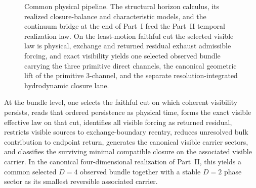 \begin{figure}[ht]
{%
}
\caption{Common physical pipeline. The structural horizon calculus, its
realized closure-balance and characteristic models, and the continuum bridge
at the end of Part~I feed the Part~II temporal realization law.
On the least-motion faithful cut the selected visible law is physical,
exchange and returned residual exhaust admissible forcing, and exact
visibility yields one selected observed bundle carrying the three primitive
direct channels, the canonical geometric lift of the primitive
\(3\)-channel, and the separate resolution-integrated hydrodynamic closure
lane.}
\label{fig:part-iv-common-pipeline}
\end{figure}

\begin{remark}
\label{rem:bundle-first-reading}
At the bundle level, one selects the faithful cut on which coherent visibility
persists, reads that ordered persistence as physical time, forms the exact
visible effective law on that cut, identifies all visible forcing as returned
residual, restricts visible sources to exchange-boundary reentry, reduces
unresolved bulk contribution to endpoint return, generates the canonical
visible carrier sectors, and classifies the surviving minimal compatible
closure on the associated visible carrier. In the canonical four-dimensional
realization of Part~II, this yields a common selected \(D=4\) observed bundle
together with a stable \(D=2\) phase sector as its smallest reversible
associated carrier.
\end{remark}

